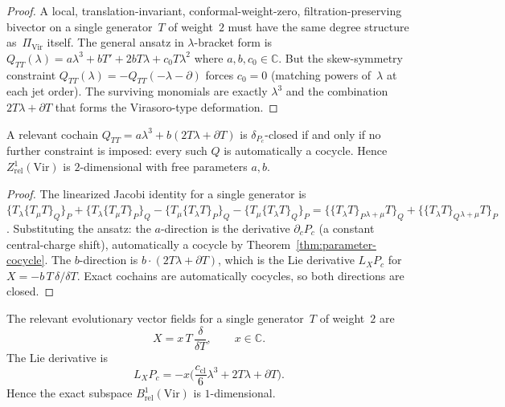 \begin{proof}
A local, translation-invariant, conformal-weight-zero, filtration-preserving
bivector on a single generator~$T$ of weight~$2$ must have the same degree
structure as~$\Pi_{\mathrm{Vir}}$ itself. The general ansatz in
$\lambda$-bracket form is
$Q_{TT}(\lambda) = a\lambda^3 + bT' + 2bT\lambda + c_0 T\lambda^2$
where $a,b,c_0\in\mathbb C$. But the skew-symmetry constraint
$Q_{TT}(\lambda) = -Q_{TT}(-\lambda-\partial)$ forces $c_0=0$ (matching
powers of~$\lambda$ at each jet order). The surviving monomials are exactly
$\lambda^3$ and the combination $2T\lambda+\partial T$ that forms the
Virasoro-type deformation.
\end{proof}

\begin{proposition}
\label{prop:virasoro-cocycles}
A relevant cochain $Q_{TT}=a\lambda^3+b(2T\lambda+\partial T)$ is
$\delta_{P_c}$-closed if and only if no further constraint is imposed:
every such $Q$ is automatically a cocycle. Hence
$Z^1_{\mathrm{rel}}(\mathrm{Vir})$ is $2$-dimensional with free parameters
$a,b$.
\end{proposition}

\begin{proof}
The linearized Jacobi identity for a single generator is
$\{T_\lambda\{T_\mu T\}_Q\}_P
 + \{T_\lambda\{T_\mu T\}_P\}_Q
 - \{T_\mu\{T_\lambda T\}_P\}_Q
 - \{T_\mu\{T_\lambda T\}_Q\}_P
 = \{\{T_\lambda T\}_P{}_{\lambda+\mu}T\}_Q
 + \{\{T_\lambda T\}_Q{}_{\lambda+\mu}T\}_P$.
Substituting the ansatz: the $a$-direction is the derivative
$\partial_c P_c$ (a constant central-charge shift), automatically a cocycle
by Theorem~\ref{thm:parameter-cocycle}. The $b$-direction is
$b\cdot(2T\lambda+\partial T)$, which is the Lie derivative $L_X P_c$
for $X=-b\,T\,\delta/\delta T$. Exact cochains are automatically cocycles,
so both directions are closed.
\end{proof}

\begin{proposition}
\label{prop:virasoro-exacts}
The relevant evolutionary vector fields for a single generator~$T$ of
weight~$2$ are
\[
X = x\,T\,\frac{\delta}{\delta T}, \qquad x\in\mathbb C.
\]
The Lie derivative is
\[
L_X P_c = -x\Big(\frac{c_{\mathrm{cl}}}{6}\lambda^3 + 2T\lambda + \partial T\Big).
\]
Hence the exact subspace $B^1_{\mathrm{rel}}(\mathrm{Vir})$ is
$1$-dimensional.
\end{proposition}

